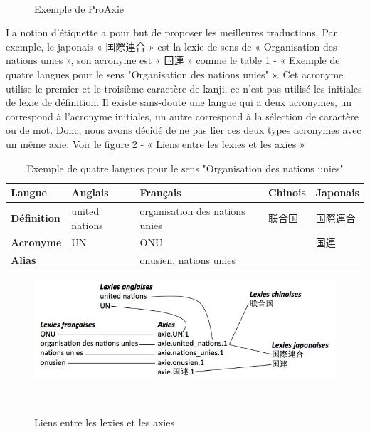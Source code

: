 \documentclass[10pt,a4paper,twoside]{article}
\begin{document}
\begin{itemize}
\begin{figure}[htbp]
\begin{center}
\end{center} 
\caption{Exemple de ProAxie} \label{image} \
\end{figure}
La notion d’étiquette a pour but de proposer les meilleures traductions. Par exemple, le japonais « 国際連合 » est la lexie de sens de « Organisation des nations unies », son acronyme est « 国連 » comme le table 1 - « Exemple de quatre langues pour le sens "Organisation des nations unies" ». Cet acronyme utilise le premier et le troisième caractère de kanji, ce n’est pas utilisé les initiales de lexie de définition. Il existe sans-doute une langue qui a deux acronymes, un correspond à l’acronyme initiales, un autre correspond à la sélection de caractère ou de mot.  Donc, nous avons décidé de ne pas lier ces deux types acronymes avec un même axie. Voir le figure 2 - « Liens entre les lexies et les axies » \\
\begin{table}[!h]
\centering
	\begin{tabular}{|l|l|l|l|l|}
	\hline
	\textbf{Langue} & \textbf{Anglais} & \textbf{Français} & \textbf{Chinois} & \textbf{Japonais} \\
	\hline
	\textbf{Définition} & united nations & organisation des nations unies & 联合国 & 国際連合 \\
 	\hline
	\textbf{Acronyme} & UN & ONU & & 国連 \\
	\hline
	\textbf{Alias} & & onusien, nations unies & &  \\
	\hline
	\end{tabular}
\caption{ Exemple de quatre langues pour le sens "Organisation des nations unies" }\label{table}
\end{table}

\begin{figure}[htbp] 
\begin{center} 
\includegraphics[width=14cm]{images/lexies-axies.jpg}
\end{center} 
\caption{Liens entre les lexies et les axies} \label{image} \
\end{figure}


\end{itemize}
\end{document}
